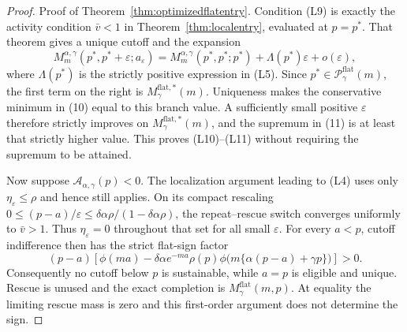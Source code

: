\documentclass[mnsc,blindrev]{informs3}
\newcommand{\ph}{\phi}
\begin{document}
\begin{proof}{Proof of Theorem~\ref{thm:optimizedflatentry}.}
Condition (L9) is exactly the activity condition $\bar v<1$ in
Theorem~\ref{thm:localentry}, evaluated at $p=p^*$.  That theorem gives a
unique cutoff and the expansion
\[
 M_m^{\alpha,\gamma}(p^*,p^*+\varepsilon;a_\varepsilon)
 =M_m^{\alpha,\gamma}(p^*,p^*;p^*)
  +\Lambda(p^*)\varepsilon+o(\varepsilon),                \tag{EC.4}
\]
where $\Lambda(p^*)$ is the strictly positive expression in (L5).  Since
$p^*\in\mathcal P_\gamma^{\mathrm{flat}}(m)$, the first term on the right is
$M_\gamma^{\mathrm{flat},*}(m)$.  Uniqueness makes the conservative minimum in (10) equal to
this branch value.  A sufficiently small positive $\varepsilon$ therefore
strictly improves on $M_\gamma^{\mathrm{flat},*}(m)$, and the supremum in (11) is at least
that strictly higher value.  This proves (L10)--(L11) without requiring the
supremum to be attained.

Now suppose $\mathcal A_{\alpha,\gamma}(p)<0$.  The localization argument
leading to (L4) uses only $\eta_\varepsilon\le\rho$ and hence still applies.
On its compact rescaling $0\le(p-a)/\varepsilon\le
\delta\alpha\rho/(1-\delta\alpha\rho)$, the repeat--rescue switch converges
uniformly to $\bar v>1$.  Thus $\eta_\varepsilon=0$ throughout that set for
all small $\varepsilon$.  For every $a<p$, cutoff indifference then has the
strict flat-sign factor
\[
 (p-a)\left[\ph(ma)-\delta\alpha e^{-ma}\rho(p)
 \ph\bigl(m\{\alpha(p-a)+\gamma p\}\bigr)\right]>0.       \tag{EC.5}
\]
Consequently no cutoff below $p$ is sustainable, while $a=p$ is eligible and
unique.  Rescue is unused and the exact completion is $M_\gamma^{\mathrm{flat}}(m,p)$.
At equality the limiting rescue mass is zero and this first-order argument
does not determine the sign.
\Halmos\end{proof}
\end{document}
